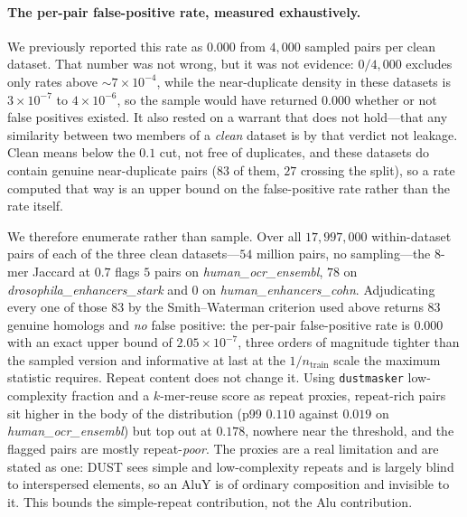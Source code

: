 \documentclass[11pt,a4paper]{article}
\begin{document}
\paragraph{The per-pair false-positive rate, measured exhaustively.} We previously reported this rate
as $0.000$ from $4{,}000$ sampled pairs per clean dataset. That number was not wrong, but it was not
evidence: $0/4{,}000$ excludes only rates above ${\sim}7\times10^{-4}$, while the near-duplicate
density in these datasets is $3\times10^{-7}$ to $4\times10^{-6}$, so the sample would have returned
$0.000$ whether or not false positives existed. It also rested on a warrant that does not hold---that
any similarity between two members of a \emph{clean} dataset is by that verdict not leakage. Clean
means below the $0.1$ cut, not free of duplicates, and these datasets do contain genuine
near-duplicate pairs ($83$ of them, $27$ crossing the split), so a rate computed that way is an upper
bound on the false-positive rate rather than the rate itself.

We therefore enumerate rather than sample. Over all $17{,}997{,}000$ within-dataset pairs of each of
the three clean datasets---$54$ million pairs, no sampling---the $8$-mer Jaccard at $0.7$ flags $5$
pairs on \textit{human\_ocr\_ensembl}, $78$ on \textit{drosophila\_enhancers\_stark} and $0$ on
\textit{human\_enhancers\_cohn}. Adjudicating every one of those $83$ by the Smith--Waterman
criterion used above returns $83$ genuine homologs and \emph{no} false positive: the per-pair
false-positive rate is $0.000$ with an exact upper bound of $2.05\times10^{-7}$, three orders of
magnitude tighter than the sampled version and informative at last at the $1/n_{\text{train}}$ scale
the maximum statistic requires. Repeat content does not change it. Using \texttt{dustmasker}
low-complexity fraction and a $k$-mer-reuse score as repeat proxies, repeat-rich pairs sit higher in
the body of the distribution (p99 $0.110$ against $0.019$ on \textit{human\_ocr\_ensembl}) but top
out at $0.178$, nowhere near the threshold, and the flagged pairs are mostly repeat-\emph{poor}. The
proxies are a real limitation and are stated as one: DUST sees simple and low-complexity repeats and
is largely blind to interspersed elements, so an AluY is of ordinary composition and invisible to it.
This bounds the simple-repeat contribution, not the Alu contribution.
\end{document}
